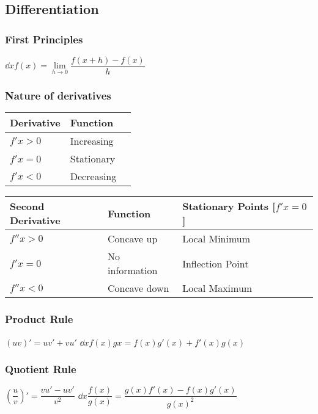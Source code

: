 		\subsection{Differentiation}

\subsubsection{First Principles}

\begin{itemize}
\itemt \( \dd{}{x} f(x) = \lim\limits_{h\to0} \dfrac{f(x+h)-f(x)}{h} \)
\end{itemize}

\subsubsection{Nature of derivatives}

\def\arraystretch{1.5}

\begin{minipage}{.5\linewidth}
\begin{tabular}{ |l|l|l| } 
\hline
\textbf{Derivative}		& \textbf{Function}
\\ \hline
$f'x > 0$				& Increasing
\\ \hline
$f'x = 0$				& Stationary
\\ \hline
$f'x < 0$				& Decreasing
\\ \hline
\end{tabular}
\begin{tabular}{ |l|l|l| } 
\hline
\textbf{Second Derivative}		& \textbf{Function}	& \textbf{Stationary Points [$f'x=0$]}
\\ \hline
$f''x > 0$					& Concave up		& Local Minimum
\\ \hline
$f'x = 0$						& No information	& Inflection Point
\\ \hline
$f''x < 0$						& Concave down		& Local Maximum
\\ \hline
\end{tabular}
\end{minipage}

\subsubsection{Product Rule}
\begin{itemize}
\itemt \( (uv)' = uv' + vu' \)
\itemt \( \dd{}{x} f(x)gx = f(x)g'(x)+f'(x)g(x) \)
\end{itemize}

\subsubsection{Quotient Rule}
\begin{itemize}
\itemt \( (\dfrac{u}{v})' = \dfrac{vu'-uv'}{v^2} \)
\itemt \( \dd{}{x} \dfrac{f(x)}{g(x)} = \dfrac{g(x)f'(x)-f(x)g'(x)}{g(x)^2} \)
\end{itemize}

